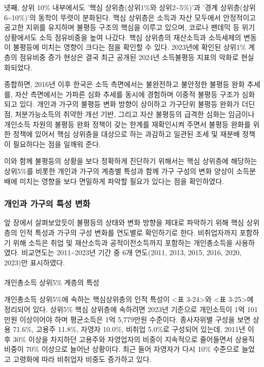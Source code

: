 \documentclass[
  letterpaper,
  DIV=11,
  numbers=noendperiod]{scrartcl}
\makeatletter
\let\oldparagraph\paragraph
\renewcommand{\paragraph}{
    \@ifstar
      \xxxParagraphStar
      \xxxParagraphNoStar
  }
\newcommand{\xxxParagraphStar}[1]{\oldparagraph*{#1}\mbox{}}
\newcommand{\xxxParagraphNoStar}[1]{\oldparagraph{#1}\mbox{}}
\makeatother
\begin{document}
넷째, 상위 10\% 내부에서도 '핵심 상위층(상위1\%와
상위2\textasciitilde5\%)'과 '경계 상위층(상위 6\textasciitilde10\%)'의
동학이 뚜렷이 분화된다. 핵심 상위층은 소득과 자산 모두에서 안정적이고
공고한 지위를 유지하며 불평등 구조의 핵심을 이루고 있으며, 코로나 팬데믹
등 위기 상황에서도 소득 점유비중을 높여 나갔다. 핵심 상위층의 재산소득과
소득세제의 변동이 불평등에 미치는 영향이 크다는 점을 확인할 수 있다.
2023년에 확인된 상위1\% 계층의 점유비중 증가 현상은 결국 최근 공개된
2024년 소득불평등 지표의 악화로 현실화되었다.

종합하면, 2016년 이후 한국은 소득 측면에서는 불완전하고 불안정한 불평등
완화 추세를, 자산 측면에서는 가파른 심화 추세를 동시에 경험하며 이중적
불평등 구조가 심화되고 있다. 개인과 가구의 불평등 변화 방향이 상이하고
가구단위 불평등 완화가 더딘 점, 처분가능소득의 취약한 개선 기반, 그리고
자산 불평등의 급격한 심화는 임금이나 개인소득 차원의 불평등 완화 정책이
갖는 한계를 재확인시켜 주면서 불평등 완화를 위한 정책에 있어서 핵심
상위층을 대상으로 하는 과감하고 일관된 조세 및 재분배 정책이 필요하다는
점을 일깨워 준다.

이와 함께 불평등의 상황을 보다 정확하게 진단하기 위해서는 핵심 상위층에
해당하는 상위5\%를 비롯한 개인과 가구의 계층별 특성과 함께 가구 구성의
변화 양상이 소득분배에 미치는 영향을 보다 면밀하게 파악할 필요가 있다는
점을 확인하였다.

\subsubsection{개인과 가구의 특성
변화}\label{uxac1cuxc778uxacfc-uxac00uxad6cuxc758-uxd2b9uxc131-uxbcc0uxd654}

앞 장에서 살펴보았듯이 불평등의 상태와 변화 방향을 제대로 파악하기 위해
핵심 상위층의 인적 특성과 가구의 구성 변화를 연도별로 확인하기로 한다.
비취업자까지 포함하기 위해 소득은 취업 및 재산소득과 공적이전소득까지
포함하는 개인총소득을 사용하였다. 비교연도는 2011\textasciitilde2023년
기간 중 6개 연도(2011, 2013, 2015, 2016, 2020, 2023)만 표시하였다.

\paragraph{개인총소득 상위5\% 계층의
특성}\label{uxac1cuxc778uxcd1duxc18cuxb4dd-uxc0c1uxc7045-uxacc4uxce35uxc758-uxd2b9uxc131}

개인총소득 상위5\%에 속하는 핵심상위층의 인적 특성이 \textless 표
3-24\textgreater 와 \textless 표 3-25\textgreater 에 정리되어 있다.
상위5\% 핵심 상위층에 속하려면 2023년 기준으로 개인소득이 1억 101만원
이상이어야 하며 평균소득은 1억 5,779만원 수준이다. 종사자위별 구성을
보면 상용 71.6\%, 고용주 11.8\%, 자영자 10.0\%, 비취업 5.0\%로 구성되어
있는데, 2011년 이후 30\% 이상을 차지하던 고용주와 자영업자의 비중이
지속적으로 줄어들면서 상용직 비중이 70\% 이상으로 늘어난 상황이다. 최근
들어 자영자가 다시 10\% 수준으로 늘었고 고령화에 따라 비취업자 비중도
증가하고 있다.
\end{document}

